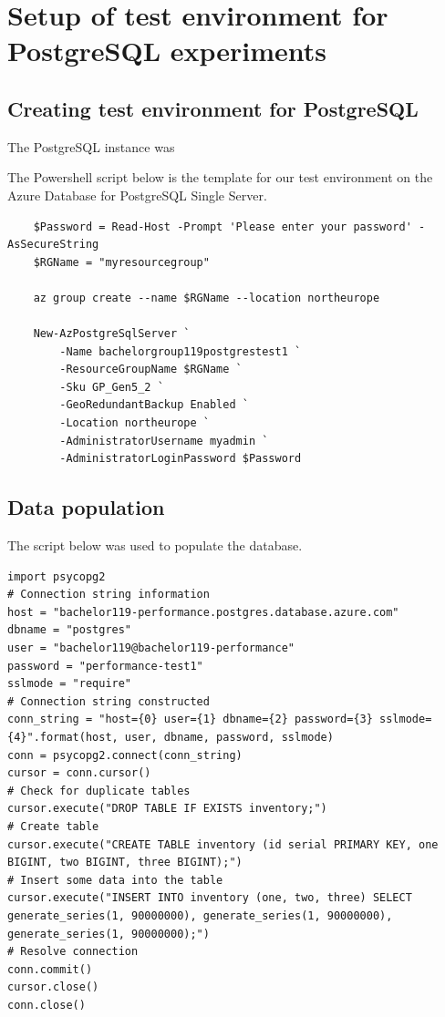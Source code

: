 \section{Setup of test environment for PostgreSQL experiments}

\subsection{Creating test environment for PostgreSQL}\label{pg_setup}
The PostgreSQL instance was 

The Powershell script below is the template for our test environment on the Azure Database for PostgreSQL Single Server.

\begin{verbatim}
    $Password = Read-Host -Prompt 'Please enter your password' -AsSecureString
    $RGName = "myresourcegroup"
    
    az group create --name $RGName --location northeurope
    
    New-AzPostgreSqlServer `
        -Name bachelorgroup119postgrestest1 `
        -ResourceGroupName $RGName `
        -Sku GP_Gen5_2 `
        -GeoRedundantBackup Enabled `
        -Location northeurope `
        -AdministratorUsername myadmin `
        -AdministratorLoginPassword $Password
\end{verbatim}

\subsection{Data population} \label{pg_populate}
The script below was used to populate the database. 
\begin{verbatim}
import psycopg2
# Connection string information
host = "bachelor119-performance.postgres.database.azure.com"
dbname = "postgres"
user = "bachelor119@bachelor119-performance"
password = "performance-test1"
sslmode = "require"
# Connection string constructed
conn_string = "host={0} user={1} dbname={2} password={3} sslmode={4}".format(host, user, dbname, password, sslmode)
conn = psycopg2.connect(conn_string) 
cursor = conn.cursor()
# Check for duplicate tables
cursor.execute("DROP TABLE IF EXISTS inventory;")
# Create table
cursor.execute("CREATE TABLE inventory (id serial PRIMARY KEY, one BIGINT, two BIGINT, three BIGINT);")
# Insert some data into the table
cursor.execute("INSERT INTO inventory (one, two, three) SELECT generate_series(1, 90000000), generate_series(1, 90000000), generate_series(1, 90000000);")
# Resolve connection
conn.commit()
cursor.close()
conn.close()
\end{verbatim}

